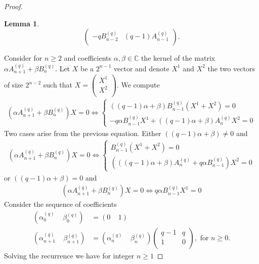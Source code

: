 \documentclass[submission]{FPSAC2023}
\newtheorem{lem}{Lemma}
\newcommand{\al}{\alpha}
\newcommand{\CC}{\mathbb{C}} %
\begin{document}
\begin{proof}
\begin{lem}
\begin{equation*}
\begin{pmatrix}
-qB_{n-2}^{(q)}&(q-1)A_{n-1}^{(q)}\\
 \end{pmatrix}.
\end{equation*}
\end{lem}
\noindent Consider for $n \geq 2$ and coefficients $\alpha, \beta \in \CC$ the kernel of the matrix $\alpha A_{n+1}^{(q)} + \beta B_n^{(q)}$.
Let $X$ be a $2^{n-1}$ vector and denote $X^1$ and $X^2$ the two vectors of size $2^{n-2}$ such that
$
X = \begin{pmatrix}
X^1\\
X^2\\
\end{pmatrix}.
$
We compute
\begin{align}
\label{equation.kernel_recurrence}
\left(\alpha A_{n+1}^{(q)} + \beta B_n^{(q)}\right)X = 0 \Leftrightarrow \begin{cases}((q-1)\al+\beta)B_{n-1}^{(q)}(X^1+X^2) = 0\\ -q\al B_{n-1}^{(q)}X^1 + ((q-1)\al+\beta)A_{n}^{(q)}X^2 = 0 \end{cases}
\end{align}
Two cases arise from the previous equation. Either $((q-1)\al+\beta) \neq 0$ and
\begin{align}
\label{equation.kernel_recurrence.case_1}
\left(\alpha A_{n+1}^{(q)} + \beta B_n^{(q)}\right)X = 0 \Leftrightarrow \begin{cases}B_{n-1}^{(q)}(X^1+X^2) = 0\\ \left(((q-1)\al+\beta)A_{n}^{(q)} + q\al B_{n-1}^{(q)}\right)X^2 = 0 \end{cases}
\end{align}
or $((q-1)\al+\beta) = 0$ and 
\begin{align}
\label{equation.kernel_recurrence.case_2}
\left(\alpha A_{n+1}^{(q)} + \beta B_n^{(q)}\right)X = 0 \Leftrightarrow  q\al B_{n-1}^{(q)}X^1 = 0
\end{align}
Consider the sequence of coefficients
\begin{align*}
\left(\alpha_0^{(q)}\;\;\;\; \beta_0^{(q)}\right) &= (0\;\;\;\; 1)\\
\left(\alpha_{n+1}^{(q)}\;\;\;\; \beta_{n+1}^{(q)}\right) &= \left(\alpha_{n}^{(q)}\;\;\;\; \beta_{n}^{(q)}\right)\begin{pmatrix}
q-1&q\\
1&0\\
\end{pmatrix}, \mbox{ for } n \geq 0.
\end{align*}
Solving the recurrence we have for integer $n \geq 1$

\end{proof}
\end{document}
